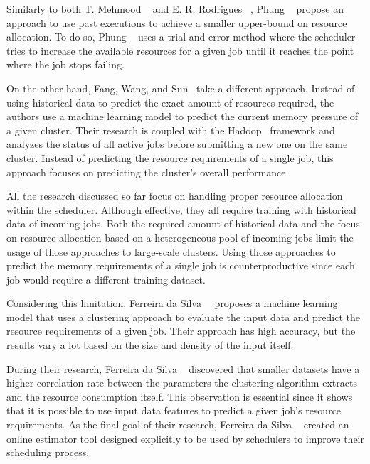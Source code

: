 Similarly to both T. Mehmood \etal~\cite{mehmood2018} and E. R. Rodrigues \etal~\cite{rodrigues2016}, Phung \etal~\cite{phung2021} propose an approach to use past executions to achieve a smaller upper-bound on resource allocation.
To do so, Phung \etal~\cite{phung2021} uses a trial and error method where the scheduler tries to increase the available resources for a given job until it reaches the point where the job stops failing.

On the other hand, Fang, Wang, and Sun~\cite{fang2018} take a different approach.
Instead of using historical data to predict the exact amount of resources required, the authors use a machine learning model to predict the current memory pressure of a given cluster.
Their research is coupled with the Hadoop~\cite{hadoop} framework and analyzes the status of all active jobs before submitting a new one on the same cluster.
Instead of predicting the resource requirements of a single job, this approach focuses on predicting the cluster's overall performance.

All the research discussed so far focus on handling proper resource allocation within the scheduler.
Although effective, they all require training with historical data of incoming jobs.
Both the required amount of historical data and the focus on resource allocation based on a heterogeneous pool of incoming jobs limit the usage of those approaches to large-scale clusters.
Using those approaches to predict the memory requirements of a single job is counterproductive since each job would require a different training dataset.

Considering this limitation, Ferreira da Silva~\etal~\cite{ferreira2013} proposes a machine learning model that uses a clustering approach to evaluate the input data and predict the resource requirements of a given job.
Their approach has high accuracy, but the results vary a lot based on the size and density of the input itself.

During their research, Ferreira da Silva \etal~\cite{ferreira2013} discovered that smaller datasets have a higher correlation rate between the parameters the clustering algorithm extracts and the resource consumption itself.
This observation is essential since it shows that it is possible to use input data features to predict a given job's resource requirements.
As the final goal of their research, Ferreira da Silva \etal~\cite{ferreira2013} created an online estimator tool designed explicitly to be used by schedulers to improve their scheduling process.

